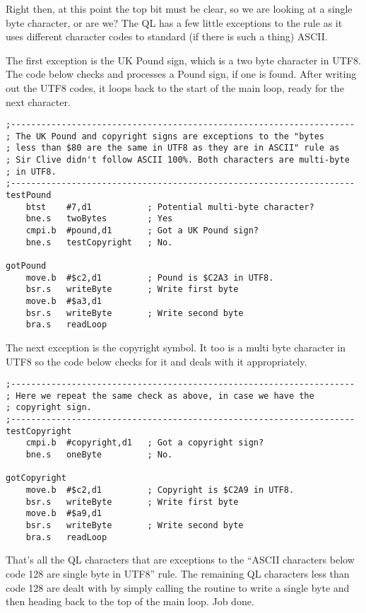 Right then, at this point the top bit must be clear, so we are looking
at a single byte character, or are we? The QL has a few little exceptions
to the rule as it uses different character codes to standard (if there
is such a thing) ASCII.

The first exception is the UK Pound sign, which is a two byte character
in UTF8. The code below checks and processes a Pound sign, if one
is found. After writing out the UTF8 codes, it loops back to the start
of the main loop, ready for the next character.

\begin{lstlisting}[firstnumber=last,caption={Ql2utf8: Handling the UK Pound}]
;--------------------------------------------------------------------
; The UK Pound and copyright signs are exceptions to the "bytes 
; less than $80 are the same in UTF8 as they are in ASCII" rule as 
; Sir Clive didn't follow ASCII 100%. Both characters are multi-byte
; in UTF8.
;--------------------------------------------------------------------
testPound
    btst    #7,d1           ; Potential multi-byte character? 
    bne.s   twoBytes        ; Yes
    cmpi.b  #pound,d1       ; Got a UK Pound sign?
    bne.s   testCopyright   ; No.

gotPound
    move.b  #$c2,d1         ; Pound is $C2A3 in UTF8.
    bsr.s   writeByte       ; Write first byte
    move.b  #$a3,d1
    bsr.s   writeByte       ; Write second byte
    bra.s   readLoop
\end{lstlisting}

The next exception is the copyright symbol. It too is a multi byte
character in UTF8 so the code below checks for it and deals with it
appropriately.

\begin{lstlisting}[firstnumber=last,caption={Ql2utf8: Handling copyright}]
;--------------------------------------------------------------------
; Here we repeat the same check as above, in case we have the
; copyright sign.
;--------------------------------------------------------------------
testCopyright
    cmpi.b  #copyright,d1   ; Got a copyright sign?
    bne.s   oneByte         ; No.

gotCopyright
    move.b  #$c2,d1         ; Copyright is $C2A9 in UTF8.
    bsr.s   writeByte       ; Write first byte
    move.b  #$a9,d1
    bsr.s   writeByte       ; Write second byte
    bra.s   readLoop

\end{lstlisting}

That's all the QL characters that are exceptions to the ``ASCII characters
below code 128 are single byte in UTF8'' rule. The remaining QL characters
less than code 128 are dealt with by simply calling the routine to
write a single byte and then heading back to the top of the main loop.
Job done.

